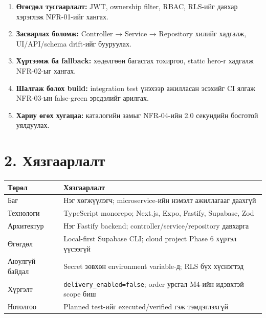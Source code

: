 \documentclass[
  mongolian,
]{article}
\providecommand{\tightlist}{%
  \setlength{\itemsep}{0pt}\setlength{\parskip}{0pt}}
\begin{document}
\begin{enumerate}
\def\labelenumi{\arabic{enumi}.}
\tightlist
\item
  \textbf{Өгөгдөл тусгаарлалт:} JWT, ownership filter, RBAC, RLS-ийг
  давхар хэрэглэж NFR-01-ийг хангах.
\item
  \textbf{Засварлах боломж:} Controller → Service → Repository хилийг
  хадгалж, UI/API/schema drift-ийг бууруулах.
\item
  \textbf{Хүртээмж ба fallback:} хөдөлгөөн багасгах тохиргоо, static
  hero-г хадгалж NFR-02-ыг хангах.
\item
  \textbf{Шалгаж болох build:} integration test үнэхээр ажилласан
  эсэхийг CI ялгаж NFR-03-ын false-green эрсдэлийг арилгах.
\item
  \textbf{Хариу өгөх хугацаа:} каталогийн замыг NFR-04-ийн 2.0 секундийн
  босготой уялдуулах.
\end{enumerate}

\section{2.
Хязгаарлалт}\label{ux445ux44fux437ux433ux430ux430ux440ux43bux430ux43bux442}

\begin{longtable}[]{@{}
  >{\raggedright\arraybackslash}p{}
  >{\raggedright\arraybackslash}p{}@{}}
\toprule\noalign{}
\begin{minipage}[b]{\linewidth}\raggedright
Төрөл
\end{minipage} & \begin{minipage}[b]{\linewidth}\raggedright
Хязгаарлалт
\end{minipage} \\
\midrule\noalign{}
\endhead
\bottomrule\noalign{}
\endlastfoot
Баг & Нэг хөгжүүлэгч; microservice-ийн нэмэлт ажиллагааг даахгүй \\
Технологи & TypeScript monorepo; Next.js, Expo, Fastify, Supabase,
Zod \\
Архитектур & Нэг Fastify backend; controller/service/repository
давхарга \\
Өгөгдөл & Local-first Supabase CLI; cloud project Phase 6 хүртэл
үүсээгүй \\
Аюулгүй байдал & Secret зөвхөн environment variable-д; RLS бүх
хүснэгтэд \\
Хүргэлт & \texttt{delivery\_enabled=false}; order урсгал M4-ийн идэвхтэй
scope биш \\
Нотолгоо & Planned test-ийг executed/verified гэж тэмдэглэхгүй \\
\end{longtable}
\end{document}
